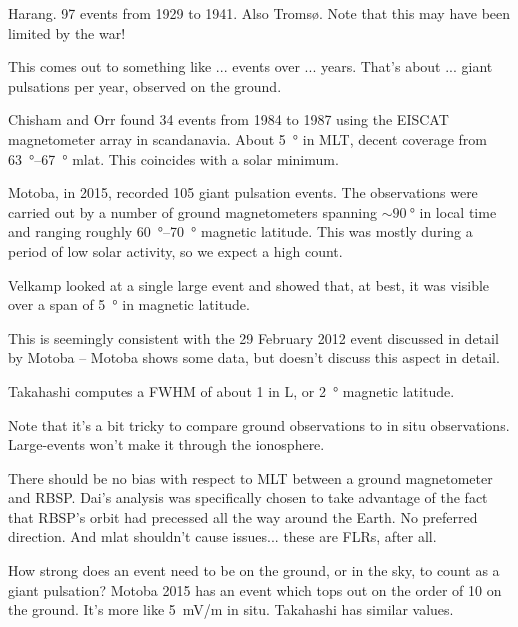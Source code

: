Harang\cite{harang_1941}. 97 events from 1929 to 1941. Also Troms{\o}. Note that this may have been limited by the war! 

This comes out to something like ... events over ... years. That's about ... giant pulsations per year, observed on the ground. 


Chisham and Orr\cite{chisham_1991} found 34 events from 1984 to 1987 using the EISCAT magnetometer array in scandanavia. About \SI{5}{\degree} in MLT, decent coverage from \SIrange{63}{67}{\degree} mlat. This coincides with a solar minimum. 

Motoba, in 2015, recorded 105 giant pulsation events. The observations were carried out by a number of ground magnetometers spanning $\sim \SI{90}{\degree}$ in local time and ranging roughly \SIrange{60}{70}{\degree} magnetic latitude\cite{motoba_2015}. This was mostly during a period of low solar activity, so we expect a high count. 


Velkamp\cite{veldkamp_1960} looked at a single large event and showed that, at best, it was visible over a span of \SI{5}{\degree} in magnetic latitude. 

This is seemingly consistent with the 29 February 2012 event discussed in detail by Motoba\cite{motoba_2015} -- Motoba shows some data, but doesn't discuss this aspect in detail. 

Takahashi\cite{takahashi_2011} computes a FWHM of about 1 in L, or \SI{2}{\degree} magnetic latitude. 


Note that it's a bit tricky to compare ground observations to in situ observations. Large-\azm events won't make it through the ionosphere. 

There should be no bias with respect to MLT between a ground magnetometer and RBSP. Dai's analysis was specifically chosen to take advantage of the fact that RBSP's orbit had precessed all the way around the Earth. No preferred direction. And mlat shouldn't cause issues... these are FLRs, after all. 

How strong does an event need to be on the ground, or in the sky, to count as a giant pulsation? Motoba 2015\cite{motoba_2015} has an event which tops out on the order of \SI{10}{\nT} on the ground. It's more like \SI{5}{\mV/\m} in situ. Takahashi\cite{takahashi_2011} has similar values. 

